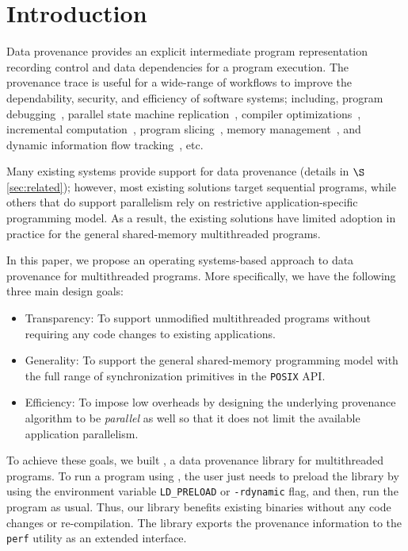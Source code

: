 \section{Introduction}
\label{sec:introduction}

Data provenance provides an explicit intermediate program representation recording control and data dependencies for a program execution.  The provenance trace is useful for a wide-range of workflows to improve the dependability, security, and efficiency of software systems; including, program debugging~\cite{fast-track-pldi}, parallel state machine replication~\cite{rex},  compiler optimizations~\cite{pgo}, incremental computation~\cite{incoop}, program slicing~\cite{roly}, memory management~\cite{memprof}, and dynamic information flow tracking~\cite{dift}, etc. 

Many existing systems provide support for data provenance (details in $\S$\ref{sec:related}); however,
most existing solutions target sequential programs, while others that do support parallelism rely on restrictive application-specific programming model. As a result, the existing solutions have limited adoption in practice for the general shared-memory multithreaded programs.



In this paper, we propose an operating systems-based approach to data provenance for multithreaded programs. More specifically, we have the following three main design goals: 
\begin{itemize} 

\item Transparency: To support unmodified multithreaded programs without requiring any code changes to existing applications. 
\item Generality: To support the general shared-memory programming model with the  full range of synchronization primitives in the {\tt POSIX} API. 
\item Efficiency: To impose low overheads by designing the underlying provenance algorithm to be  {\em parallel} as well so that it does not limit the available application parallelism.

\end{itemize}

To achieve these goals, we built \projecttitle, a data provenance library for multithreaded programs. To run a program using \projecttitle,  the user just needs to preload the \projecttitle library  by using the environment variable {\tt LD\_PRELOAD} or {\tt -rdynamic} flag, and then, run the program as usual. Thus, our library benefits existing binaries without any code changes or re-compilation. The library exports the provenance information to the {\tt perf} utility as an extended interface.


